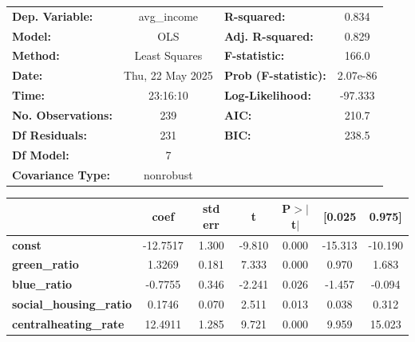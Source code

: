 \begin{center}
\begin{tabular}{lclc}
\toprule
\textbf{Dep. Variable:}           &   avg\_income    & \textbf{  R-squared:         } &     0.834   \\
\textbf{Model:}                   &       OLS        & \textbf{  Adj. R-squared:    } &     0.829   \\
\textbf{Method:}                  &  Least Squares   & \textbf{  F-statistic:       } &     166.0   \\
\textbf{Date:}                    & Thu, 22 May 2025 & \textbf{  Prob (F-statistic):} &  2.07e-86   \\
\textbf{Time:}                    &     23:16:10     & \textbf{  Log-Likelihood:    } &   -97.333   \\
\textbf{No. Observations:}        &         239      & \textbf{  AIC:               } &     210.7   \\
\textbf{Df Residuals:}            &         231      & \textbf{  BIC:               } &     238.5   \\
\textbf{Df Model:}                &           7      & \textbf{                     } &             \\
\textbf{Covariance Type:}         &    nonrobust     & \textbf{                     } &             \\
\bottomrule
\end{tabular}
\begin{tabular}{lcccccc}
                                  & \textbf{coef} & \textbf{std err} & \textbf{t} & \textbf{P$> |$t$|$} & \textbf{[0.025} & \textbf{0.975]}  \\
\midrule
\textbf{const}                    &     -12.7517  &        1.300     &    -9.810  &         0.000        &      -15.313    &      -10.190     \\
\textbf{green\_ratio}             &       1.3269  &        0.181     &     7.333  &         0.000        &        0.970    &        1.683     \\
\textbf{blue\_ratio}              &      -0.7755  &        0.346     &    -2.241  &         0.026        &       -1.457    &       -0.094     \\
\textbf{social\_housing\_ratio}   &       0.1746  &        0.070     &     2.511  &         0.013        &        0.038    &        0.312     \\
\textbf{centralheating\_rate}     &      12.4911  &        1.285     &     9.721  &         0.000        &        9.959    &       15.023     \\

\end{tabular}
\end{center}
